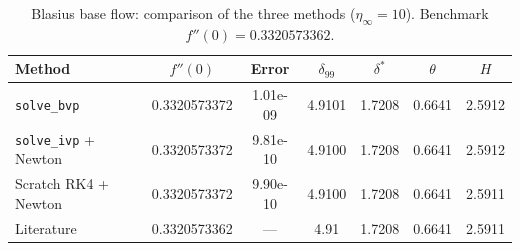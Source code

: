\begin{table}[htbp]
  \centering
  \caption{Blasius base flow: comparison of the three methods ($\eta_\infty = 10$). Benchmark $f''(0) = 0.3320573362$.}
  \label{tab:blasius}
  \begin{tabular}{lcccccc}
    \toprule
    Method & $f''(0)$ & Error & $\delta_{99}$ & $\delta^*$ & $\theta$ & $H$ \\
    \midrule
    \texttt{solve\_bvp} & 0.3320573372 & 1.01e-09 & 4.9101 & 1.7208 & 0.6641 & 2.5912 \\
    \texttt{solve\_ivp} + Newton & 0.3320573372 & 9.81e-10 & 4.9100 & 1.7208 & 0.6641 & 2.5912 \\
    Scratch RK4 + Newton & 0.3320573372 & 9.90e-10 & 4.9100 & 1.7208 & 0.6641 & 2.5911 \\
    \midrule
    Literature & 0.3320573362 & --- & 4.91 & 1.7208 & 0.6641 & 2.5911 \\
    \bottomrule
  \end{tabular}
\end{table}
